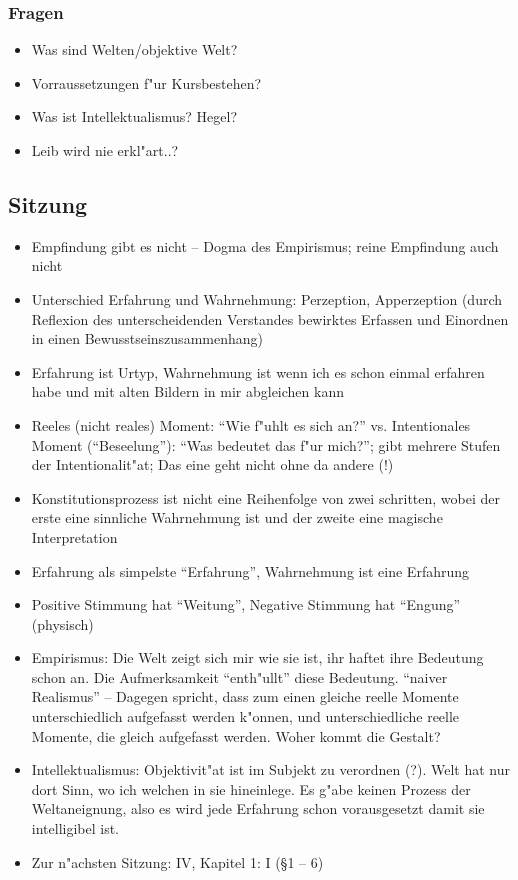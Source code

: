 \documentclass[emulatestandardclasses]{scrartcl}
\begin{document}
\subsubsection{Fragen}

\begin{itemize}
  \item Was sind Welten/objektive Welt?
  \item Vorraussetzungen f"ur Kursbestehen?
  \item Was ist Intellektualismus? Hegel?
  \item Leib wird nie erkl"art..?
\end{itemize}

\subsection{Sitzung}

\begin{itemize}
  \item Empfindung gibt es nicht -- Dogma des Empirismus; reine Empfindung auch nicht
  \item Unterschied Erfahrung und Wahrnehmung: Perzeption, Apperzeption (durch Reflexion des unterscheidenden Verstandes bewirktes Erfassen und Einordnen in einen Bewusstseinszusammenhang)
  \item Erfahrung ist Urtyp, Wahrnehmung ist wenn ich es schon einmal erfahren habe und mit alten Bildern in mir abgleichen kann
  \item Reeles (nicht reales) Moment: "`Wie f"uhlt es sich an?"' vs. Intentionales Moment ("`Beseelung"'): "`Was bedeutet das f"ur mich?"'; gibt mehrere Stufen der Intentionalit"at; Das eine geht nicht ohne da andere (!)
  \item Konstitutionsprozess ist nicht eine Reihenfolge von zwei schritten, wobei der erste eine sinnliche Wahrnehmung ist und der zweite eine magische Interpretation 
  \item Erfahrung als simpelste "`Erfahrung"', Wahrnehmung ist eine Erfahrung
  \item Positive Stimmung hat "`Weitung"', Negative Stimmung hat "`Engung"' (physisch)
  \item Empirismus: Die Welt zeigt sich mir wie sie ist, ihr haftet ihre Bedeutung schon an. Die Aufmerksamkeit "`enth"ullt"' diese Bedeutung. "`naiver Realismus"' -- Dagegen spricht, dass zum einen gleiche reelle Momente unterschiedlich aufgefasst werden k"onnen, und unterschiedliche reelle Momente, die gleich aufgefasst werden. Woher kommt die Gestalt?
  \item Intellektualismus: Objektivit"at ist im Subjekt zu verordnen (?). Welt hat nur dort Sinn, wo ich welchen in sie hineinlege. Es g"abe keinen Prozess der Weltaneignung, also es wird jede Erfahrung schon vorausgesetzt damit sie intelligibel ist.
  \item Zur n"achsten Sitzung: IV, Kapitel 1: I (\S 1 -- 6)
\end{itemize}
\end{document}
